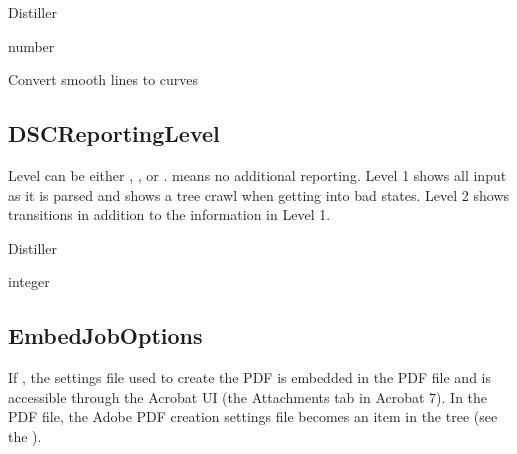 \documentclass[letterpaper,12pt,english,openany,oneside]{sphinxmanual}
\begin{document}
\label{\detokenize{PDF_Create_CommonSettings:supported-by-93}}

Distiller

\label{\detokenize{PDF_Create_CommonSettings:type-92}}

number

\label{\detokenize{PDF_Create_CommonSettings:ui-name-76}}

Convert smooth lines to curves

\label{\detokenize{PDF_Create_CommonSettings:default-value-87}}

\begin{sphinxVerbatim}[commandchars=\\\{\}]
\end{sphinxVerbatim}


\subsection{DSCReportingLevel}
\label{\detokenize{PDF_Create_CommonSettings:dscreportinglevel}}
Level can be either  ,  , or  .  means no additional reporting. Level 1 shows all input as it is parsed and shows a tree crawl when getting into bad states. Level 2 shows transitions in addition to the information in Level 1.

\label{\detokenize{PDF_Create_CommonSettings:supported-by-94}}

Distiller

\label{\detokenize{PDF_Create_CommonSettings:type-93}}

integer

\label{\detokenize{PDF_Create_CommonSettings:default-value-88}}

\begin{sphinxVerbatim}[commandchars=\\\{\}]
\end{sphinxVerbatim}




\subsection{EmbedJobOptions}
\label{\detokenize{PDF_Create_CommonSettings:embedjoboptions}}
If  , the settings file used to create the PDF is embedded in the PDF file and is accessible through the Acrobat UI (the Attachments tab in Acrobat 7). In the PDF file, the Adobe PDF creation settings file becomes an item in the  tree (see the  ).
\end{document}
